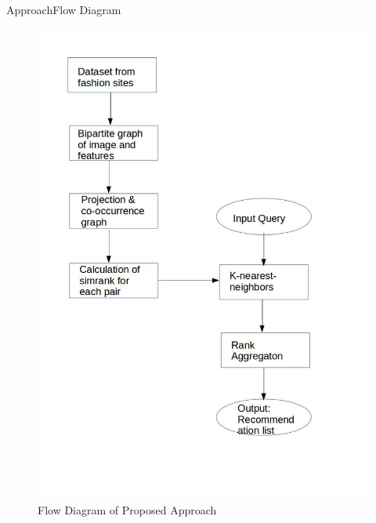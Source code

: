 \documentclass[10pt]{beamer}
\begin{document}

\begin{frame}{Approach}{Flow Diagram}
\begin{figure}[t]
    \centering
    \includegraphics[height=\dimexpr11\textheight/16\relax]{flowchart}
    \caption{Flow Diagram of Proposed Approach}
  \end{figure}
\end{frame}
\end{document}
